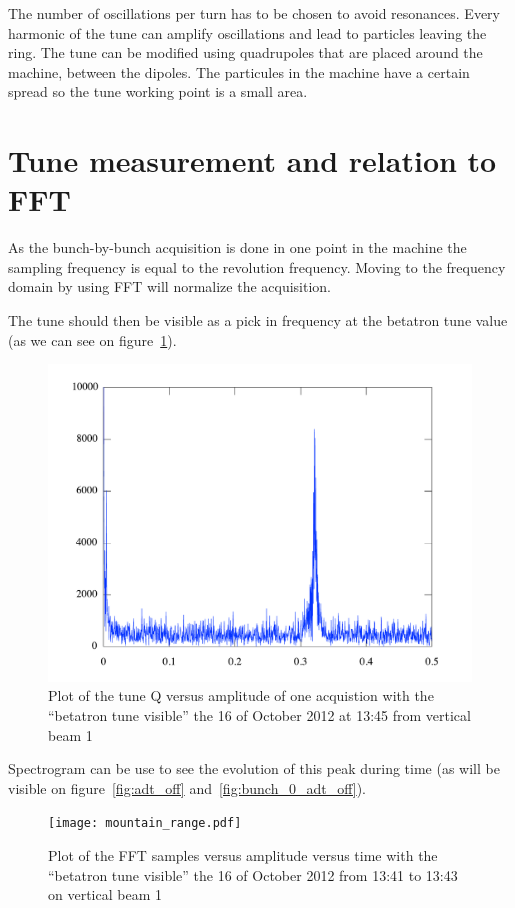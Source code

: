 The number of oscillations per turn has to be chosen to avoid resonances. Every harmonic of the tune can amplify oscillations and lead to particles leaving the ring. The tune can be modified using quadrupoles that are placed around the machine, between the dipoles. The particules in the machine have a certain spread so the tune working point is a small area.

\section{Tune measurement and relation to FFT}

As the bunch-by-bunch acquisition is done in one point in the machine the sampling frequency is equal to the revolution frequency. Moving to the frequency domain by using \gls{FFT} will normalize the acquisition.

The tune should then be visible as a pick in frequency at the betatron tune value (as we can see on figure~\ref{fig:tune_single}).

\begin{figure}[H]
\centering
\caption{Plot of the tune Q versus amplitude of one acquistion with the ``betatron tune visible'' the 16 of October 2012 at 13:45 from vertical beam 1}
\label{fig:tune_single}
\includegraphics[scale=0.5]{fft_single.pdf}
\end{figure}

Spectrogram can be use to see the evolution of this peak during time (as will be visible on figure~\ref{fig:adt_off} and~\ref{fig:bunch_0_adt_off}).

\begin{figure}[H]
\centering
\caption{Plot of the FFT samples versus amplitude versus time with the ``betatron tune visible'' the 16 of October 2012 from 13:41 to 13:43 on vertical beam 1}
\label{fig:moutain_range}
\texttt{[image: mountain\_range.pdf]}
\end{figure}

